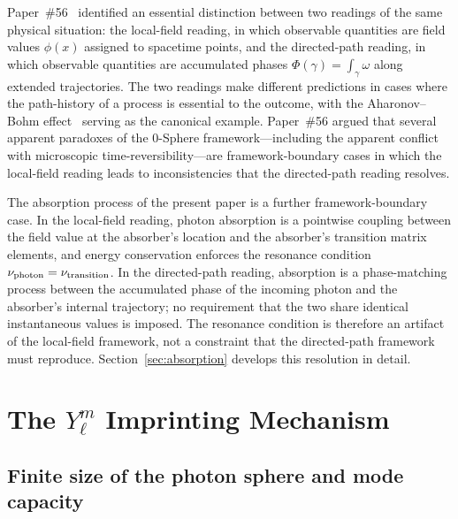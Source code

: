 \documentclass[%
 reprint, amsmath,amssymb, aps, prb, ]{revtex4-2}
\numberwithin{equation}{section}
\begin{document}
Paper~\#56~\cite{hanamura56} identified an essential distinction between two readings of the same physical situation: the local-field reading, in which observable quantities are field values $\phi(x)$ assigned to spacetime points, and the directed-path reading, in which observable quantities are accumulated phases $\Phi(\gamma) = \int_\gamma \omega$ along extended trajectories. The two readings make different predictions in cases where the path-history of a process is essential to the outcome, with the Aharonov--Bohm effect~\cite{aharonov_bohm1959} serving as the canonical example. Paper~\#56 argued that several apparent paradoxes of the 0-Sphere framework---including the apparent conflict with microscopic time-reversibility---are framework-boundary cases in which the local-field reading leads to inconsistencies that the directed-path reading resolves.

The absorption process of the present paper is a further framework-boundary case. In the local-field reading, photon absorption is a pointwise coupling between the field value at the absorber's location and the absorber's transition matrix elements, and energy conservation enforces the resonance condition $\nu_{\rm photon} = \nu_{\rm transition}$. In the directed-path reading, absorption is a phase-matching process between the accumulated phase of the incoming photon and the absorber's internal trajectory; no requirement that the two share identical instantaneous values is imposed. The resonance condition is therefore an artifact of the local-field framework, not a constraint that the directed-path framework must reproduce. Section~\ref{sec:absorption} develops this resolution in detail.

\section{\texorpdfstring{The $Y_\ell^m$ Imprinting Mechanism}{The Y l m Imprinting Mechanism}}
\label{sec:imprinting}

\subsection{Finite size of the photon sphere and mode capacity}
\end{document}
